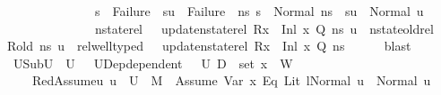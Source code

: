 \begin{isabellebody}
\ \ \ \ \ \ \ \ \ \ \ \ \ \ {\isacharparenleft}{\kern0pt}s{\isacharprime}{\kern0pt}\ {\isacharequal}{\kern0pt}\ Failure\ {\isasymlongrightarrow}\ su\ {\isacharequal}{\kern0pt}\ Failure{\isacharparenright}{\kern0pt}\ {\isasymand}\ {\isacharparenleft}{\kern0pt}{\isasymforall}ns{\isacharprime}{\kern0pt}{\isachardot}{\kern0pt}\ s{\isacharprime}{\kern0pt}\ {\isacharequal}{\kern0pt}\ Normal\ ns{\isacharprime}{\kern0pt}\ {\isasymlongrightarrow}\ su\ {\isacharequal}{\kern0pt}\ Normal\ u\ {\isasymand}\isanewline
\ \ \ \ \ \ \ \ \ \ \ \ \ \ nstate{\isacharunderscore}{\kern0pt}rel\ {\isasymLambda}\ {\isasymLambda}{\isacharprime}{\kern0pt}\ {\isacharparenleft}{\kern0pt}update{\isacharunderscore}{\kern0pt}nstate{\isacharunderscore}{\kern0pt}rel\ {\isacharparenleft}{\kern0pt}R{\isacharparenleft}{\kern0pt}x\ {\isasymmapsto}\ Inl\ x{}{\isacharparenright}{\kern0pt}{\isacharparenright}{\kern0pt}\ Q{\isacharparenright}{\kern0pt}\ ns{\isacharprime}{\kern0pt}\ u\ {\isasymand}\ nstate{\isacharunderscore}{\kern0pt}old{\isacharunderscore}{\kern0pt}rel\ {\isasymLambda}\ {\isasymLambda}{\isacharprime}{\kern0pt}\ R{\isacharunderscore}{\kern0pt}old\ ns{\isacharprime}{\kern0pt}\ u\ {\isasymand}\ rel{\isacharunderscore}{\kern0pt}well{\isacharunderscore}{\kern0pt}typed\ {\isasymLambda}\ {\isasymOmega}\ {\isacharparenleft}{\kern0pt}update{\isacharunderscore}{\kern0pt}nstate{\isacharunderscore}{\kern0pt}rel\ {\isacharparenleft}{\kern0pt}R{\isacharparenleft}{\kern0pt}x\ {\isasymmapsto}\ Inl\ x{}{\isacharparenright}{\kern0pt}{\isacharparenright}{\kern0pt}\ Q{\isacharparenright}{\kern0pt}\ ns{\isacharprime}{\kern0pt}{\isacharparenright}{\kern0pt}{\isachardoublequoteclose}\isanewline
\ \ \ \ \isamarkupfalse%
\ blast\isanewline
\ \ \ \isamarkupfalse%
\ U{}Sub{\isacharprime}{\kern0pt}{\isacharcolon}{\kern0pt}{\isachardoublequoteopen}U{}\ {\isasymsubseteq}\ U{}{\isachardoublequoteclose}\ \ \ U{}Dep{\isacharprime}{\kern0pt}{\isacharcolon}{\kern0pt}{\isachardoublequoteopen}dependent\ {\isasymLambda}{\isacharprime}{\kern0pt}\ {\isasymOmega}\ U{}\ {\isacharparenleft}{\kern0pt}D{}\ {\isasymunion}\ set\ {\isacharparenleft}{\kern0pt}x{}\ {\isacharhash}{\kern0pt}\ W{\isacharparenright}{\kern0pt}{\isacharparenright}{\kern0pt}{\isachardoublequoteclose}\ \ \isanewline
\ \ \ \ RedAssume{}{\isacharcolon}{\kern0pt}{\isachardoublequoteopen}{\isasymAnd}u{\isachardot}{\kern0pt}\ u\ {\isasymin}\ U{}\ {\isasymLongrightarrow}\ M{\isacharcomma}{\kern0pt}{\isasymLambda}{\isacharprime}{\kern0pt}{\isacharcomma}{\kern0pt}{\isasymGamma}{\isacharcomma}{\kern0pt}{\isasymOmega}\ {\isasymturnstile}\ {\isasymlangle}Assume\ {\isacharparenleft}{\kern0pt}{\isacharparenleft}{\kern0pt}Var\ x{}{\isacharparenright}{\kern0pt}\ {\isasymguillemotleft}Eq{\isasymguillemotright}\ {\isacharparenleft}{\kern0pt}Lit\ l{\isacharparenright}{\kern0pt}{\isacharparenright}{\kern0pt}{\isacharcomma}{\kern0pt}Normal\ u{\isasymrangle}\ {\isasymrightarrow}\ Normal\ u{\isachardoublequoteclose}\isanewline

\end{isabellebody}
